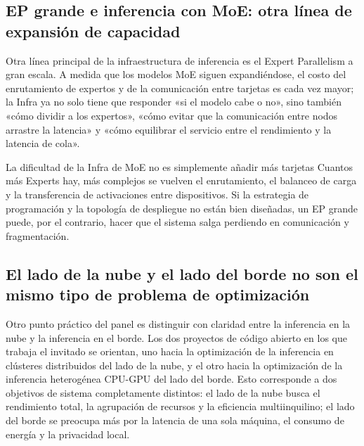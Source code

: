 \subsection{EP grande e inferencia con MoE: otra línea de expansión de capacidad}
Otra línea principal de la infraestructura de inferencia es el Expert Parallelism a gran escala. A medida que los modelos MoE siguen expandiéndose, el costo del enrutamiento de expertos y de la comunicación entre tarjetas es cada vez mayor; la Infra ya no solo tiene que responder «si el modelo cabe o no», sino también «cómo dividir a los expertos», «cómo evitar que la comunicación entre nodos arrastre la latencia» y «cómo equilibrar el servicio entre el rendimiento y la latencia de cola».

\begin{warningbox}{La dificultad de la Infra de MoE no es simplemente añadir más tarjetas}
Cuantos más Experts hay, más complejos se vuelven el enrutamiento, el balanceo de carga y la transferencia de activaciones entre dispositivos. Si la estrategia de programación y la topología de despliegue no están bien diseñadas, un EP grande puede, por el contrario, hacer que el sistema salga perdiendo en comunicación y fragmentación.
\end{warningbox}

\subsection{El lado de la nube y el lado del borde no son el mismo tipo de problema de optimización}
Otro punto práctico del panel es distinguir con claridad entre la inferencia en la nube y la inferencia en el borde. Los dos proyectos de código abierto en los que trabaja el invitado se orientan, uno hacia la optimización de la inferencia en clústeres distribuidos del lado de la nube, y el otro hacia la optimización de la inferencia heterogénea CPU-GPU del lado del borde. Esto corresponde a dos objetivos de sistema completamente distintos: el lado de la nube busca el rendimiento total, la agrupación de recursos y la eficiencia multiinquilino; el lado del borde se preocupa más por la latencia de una sola máquina, el consumo de energía y la privacidad local.

